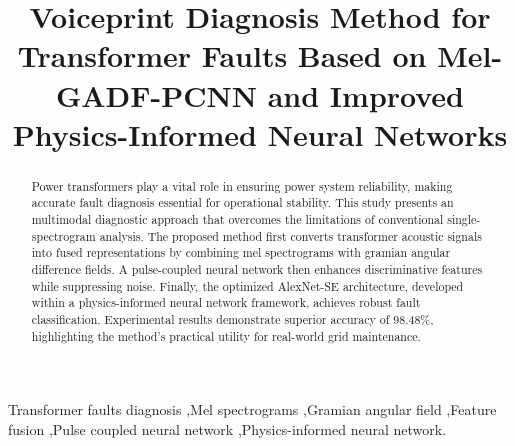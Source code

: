 \documentclass[final,5p,times,twocolumn]{elsarticle}
\begin{document}
\begin{frontmatter}

\title{Voiceprint Diagnosis Method for Transformer Faults Based on Mel-GADF-PCNN and Improved Physics-Informed Neural Networks} 


            

\begin{abstract}
Power transformers play a vital role in ensuring power system reliability, making accurate fault diagnosis essential for operational stability. This study presents an multimodal diagnostic approach that overcomes the limitations of conventional single-spectrogram analysis. The proposed method first converts transformer acoustic signals into fused representations by combining mel spectrograms with gramian angular difference fields. A pulse-coupled neural network then enhances discriminative features while suppressing noise. Finally, the optimized AlexNet-SE architecture, developed within a physics-informed neural network framework, achieves robust fault classification. Experimental results demonstrate superior accuracy of 98.48\%, highlighting the method's practical utility for real-world grid maintenance.
\end{abstract}

\begin{keyword}Transformer faults diagnosis \sep Mel spectrograms \sep Gramian angular field \sep Feature fusion \sep Pulse coupled neural network \sep Physics-informed neural network.
\end{keyword}

\end{frontmatter}
\end{document}
